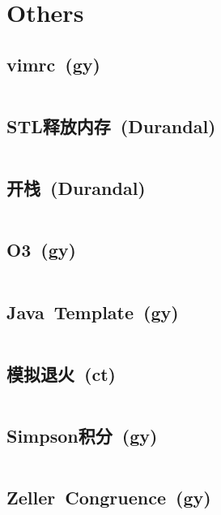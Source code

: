 \chapter{Others}
\section{vimrc\ \small(gy)}
	\inputminted{vim}{Others/.vimrc}
\section{STL释放内存\ \small(Durandal)}
	\inputminted{cpp}{Others/stl_clear.cpp}
\section{开栈\ \small(Durandal)}
	\inputminted{cpp}{Others/rsp.cpp}
\section{O3\ \small(gy)}
	\inputminted{cpp}{Others/o3.cpp}
\section{Java\ Template\ \small(gy)}
	\inputminted{java}{Others/Template.java}
\section{模拟退火\ \small(ct)}
	\inputminted{cpp}{Others/simulated_annealing.cpp}
\section{Simpson积分\ \small(gy)}
	\inputminted{cpp}{Others/simpson.cpp}
\section{Zeller\ Congruence\ \small(gy)}
	\inputminted{cpp}{Others/zeller_congruence.cpp}
